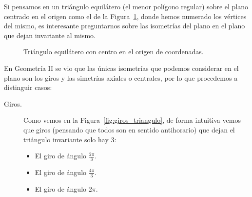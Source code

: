 \begin{ejemplo}
    Si pensamos en un triángulo equilátero (el menor polígono regular) sobre el plano centrado en el origen como el de la Figura~\ref{fig:triangulo}, donde hemos numerado los vértices del mismo, es interesante preguntarnos sobre las isometrías del plano en el plano que dejan invariante al mismo.
    \begin{figure}[H]
        \centering
        \caption{Triángulo equilátero con centro en el origen de coordenadas.}
        \label{fig:triangulo}
    \end{figure}

    En Geometría II se vio que las únicas isometrías que podemos considerar en el plano son los giros y las simetrías axiales o centrales, por lo que procedemos a distinguir casos:
    \begin{description}
        \item [Giros.] Como vemos en la Figura~\ref{fig:giros_triangulo}, de forma intuitiva vemos que giros (pensando que todos son en sentido antihorario) que dejan el triángulo invariante solo hay 3:
            \begin{itemize}
                \item El giro de ángulo $\frac{2\pi}{3}$.
                \item El giro de ángulo $\frac{4\pi}{3}$.
                \item El giro de ángulo $2\pi$.
            \end{itemize}
            \begin{figure}[H]
                \centering
\end{figure}
\end{description}
\end{ejemplo}
